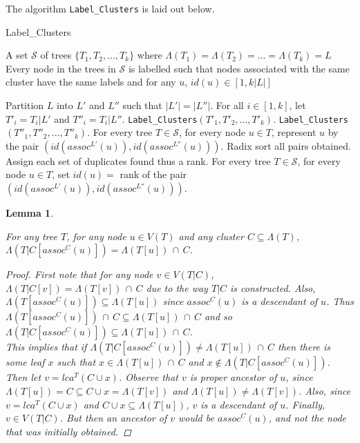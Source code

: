 \documentclass{article}
\newcommand{\leafset}{\Lambda}
\newtheorem{assocnode}[incompatibility]{Lemma}
\begin{document}
    The algorithm \texttt{Label\_Clusters} is laid out below.

    \begin{algorithm}
        \caption{Label\_Clusters}
        \begin{algorithmic}[1]
            \Input A set $\mathcal{S}$ of trees $\{T_1, T_2, ..., T_k\}$ where $\leafset(T_1) = \leafset(T_2) = ... = \leafset(T_k) = L$
            \Output Every node in the trees in $\mathcal{S}$ is labelled such that nodes associated with the same cluster have the same labels and for any $u$, $id(u) \in [1, k |L|]$

            \State Partition $L$ into $L'$ and $L''$ such that $|L'| = |L''|$.
            \State For all $i \in [1,k]$, let $T'_i = T_i|L'$ and $T''_i = T_i|L''$.
            \State \texttt{Label\_Clusters}$(T'_1, T'_2, ..., T'_k)$.
            \State \texttt{Label\_Clusters}$(T''_1, T''_2, ..., T''_k)$.
            \State For every tree $T \in \mathcal{S}$, for every node $u \in T$, represent $u$ by the pair $(id(assoc^{L'}(u)), id(assoc^{L''}(u)))$.
            \State Radix sort all pairs obtained. Assign each set of duplicates found thus a rank.
            \State For every tree $T \in \mathcal{S}$, for every node $u \in T$, set $id(u) = $ rank of the pair $(id(assoc^{L'}(u)), id(assoc^{L''}(u)))$.
        \end{algorithmic}
    \end{algorithm}

    \begin{assocnode}
        \label{lem:assocnode}

        For any tree $T$, for any node $u \in V(T)$ and any cluster $C \subseteq \leafset(T)$, $\leafset(T|C[assoc^C(u)]) = \leafset(T[u])\, \cap\, C$.

        \begin{proof}
            First note that for any node $v \in V(T|C)$, $\leafset(T|C[v]) = \leafset(T[v])\, \cap\, C$ due to the way $T|C$ is constructed. Also, $\leafset(T[assoc^C(u)]) \subseteq \leafset(T[u])$ since $assoc^C(u)$ is a descendant of $u$. Thus $\leafset(T[assoc^C(u)])\, \cap\, C \subseteq \leafset(T[u])\, \cap\, C$ and so $\leafset(T|C[assoc^C(u)]) \subseteq \leafset(T[u])\, \cap\, C$.\\

            This implies that if $\leafset(T|C[assoc^C(u)]) \neq \leafset(T[u])\, \cap\, C$ then there is some leaf $x$ such that $x \in \leafset(T[u])\, \cap\, C$ and $x \not\in \leafset(T|C[assoc^C(u)])$. Then let $v = lca^T(C \cup x)$. Observe that $v$ is proper ancestor of $u$, since $\leafset(T[u]) = C \subseteq C \cup x = \leafset(T[v])$ and $\leafset(T[u]) \neq \leafset(T[v])$. Also, since $v = lca^T(C \cup x)$ and $C \cup x \subseteq \leafset(T[u])$, $v$ is a descendant of $u$. Finally, $v \in V(T|C)$. But then an ancestor of $v$ would be $assoc^C(u)$, and not the node that was initially obtained.
        \end{proof}
    \end{assocnode}
\end{document}
